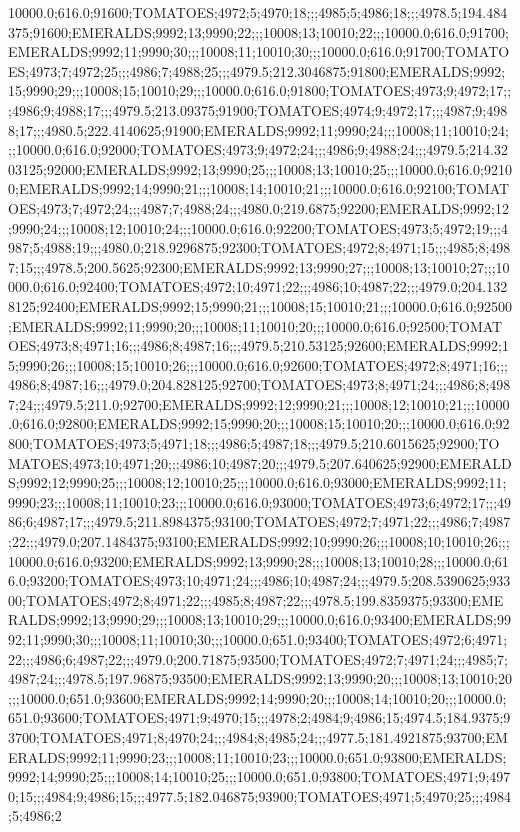 10000.0;616.0;91600;TOMATOES;4972;5;4970;18;;;4985;5;4986;18;;;4978.5;194.484375;91600;EMERALDS;9992;13;9990;22;;;10008;13;10010;22;;;10000.0;616.0;91700;EMERALDS;9992;11;9990;30;;;10008;11;10010;30;;;10000.0;616.0;91700;TOMATOES;4973;7;4972;25;;;4986;7;4988;25;;;4979.5;212.3046875;91800;EMERALDS;9992;15;9990;29;;;10008;15;10010;29;;;10000.0;616.0;91800;TOMATOES;4973;9;4972;17;;;4986;9;4988;17;;;4979.5;213.09375;91900;TOMATOES;4974;9;4972;17;;;4987;9;4988;17;;;4980.5;222.4140625;91900;EMERALDS;9992;11;9990;24;;;10008;11;10010;24;;;10000.0;616.0;92000;TOMATOES;4973;9;4972;24;;;4986;9;4988;24;;;4979.5;214.3203125;92000;EMERALDS;9992;13;9990;25;;;10008;13;10010;25;;;10000.0;616.0;92100;EMERALDS;9992;14;9990;21;;;10008;14;10010;21;;;10000.0;616.0;92100;TOMATOES;4973;7;4972;24;;;4987;7;4988;24;;;4980.0;219.6875;92200;EMERALDS;9992;12;9990;24;;;10008;12;10010;24;;;10000.0;616.0;92200;TOMATOES;4973;5;4972;19;;;4987;5;4988;19;;;4980.0;218.9296875;92300;TOMATOES;4972;8;4971;15;;;4985;8;4987;15;;;4978.5;200.5625;92300;EMERALDS;9992;13;9990;27;;;10008;13;10010;27;;;10000.0;616.0;92400;TOMATOES;4972;10;4971;22;;;4986;10;4987;22;;;4979.0;204.1328125;92400;EMERALDS;9992;15;9990;21;;;10008;15;10010;21;;;10000.0;616.0;92500;EMERALDS;9992;11;9990;20;;;10008;11;10010;20;;;10000.0;616.0;92500;TOMATOES;4973;8;4971;16;;;4986;8;4987;16;;;4979.5;210.53125;92600;EMERALDS;9992;15;9990;26;;;10008;15;10010;26;;;10000.0;616.0;92600;TOMATOES;4972;8;4971;16;;;4986;8;4987;16;;;4979.0;204.828125;92700;TOMATOES;4973;8;4971;24;;;4986;8;4987;24;;;4979.5;211.0;92700;EMERALDS;9992;12;9990;21;;;10008;12;10010;21;;;10000.0;616.0;92800;EMERALDS;9992;15;9990;20;;;10008;15;10010;20;;;10000.0;616.0;92800;TOMATOES;4973;5;4971;18;;;4986;5;4987;18;;;4979.5;210.6015625;92900;TOMATOES;4973;10;4971;20;;;4986;10;4987;20;;;4979.5;207.640625;92900;EMERALDS;9992;12;9990;25;;;10008;12;10010;25;;;10000.0;616.0;93000;EMERALDS;9992;11;9990;23;;;10008;11;10010;23;;;10000.0;616.0;93000;TOMATOES;4973;6;4972;17;;;4986;6;4987;17;;;4979.5;211.8984375;93100;TOMATOES;4972;7;4971;22;;;4986;7;4987;22;;;4979.0;207.1484375;93100;EMERALDS;9992;10;9990;26;;;10008;10;10010;26;;;10000.0;616.0;93200;EMERALDS;9992;13;9990;28;;;10008;13;10010;28;;;10000.0;616.0;93200;TOMATOES;4973;10;4971;24;;;4986;10;4987;24;;;4979.5;208.5390625;93300;TOMATOES;4972;8;4971;22;;;4985;8;4987;22;;;4978.5;199.8359375;93300;EMERALDS;9992;13;9990;29;;;10008;13;10010;29;;;10000.0;616.0;93400;EMERALDS;9992;11;9990;30;;;10008;11;10010;30;;;10000.0;651.0;93400;TOMATOES;4972;6;4971;22;;;4986;6;4987;22;;;4979.0;200.71875;93500;TOMATOES;4972;7;4971;24;;;4985;7;4987;24;;;4978.5;197.96875;93500;EMERALDS;9992;13;9990;20;;;10008;13;10010;20;;;10000.0;651.0;93600;EMERALDS;9992;14;9990;20;;;10008;14;10010;20;;;10000.0;651.0;93600;TOMATOES;4971;9;4970;15;;;4978;2;4984;9;4986;15;4974.5;184.9375;93700;TOMATOES;4971;8;4970;24;;;4984;8;4985;24;;;4977.5;181.4921875;93700;EMERALDS;9992;11;9990;23;;;10008;11;10010;23;;;10000.0;651.0;93800;EMERALDS;9992;14;9990;25;;;10008;14;10010;25;;;10000.0;651.0;93800;TOMATOES;4971;9;4970;15;;;4984;9;4986;15;;;4977.5;182.046875;93900;TOMATOES;4971;5;4970;25;;;4984;5;4986;2